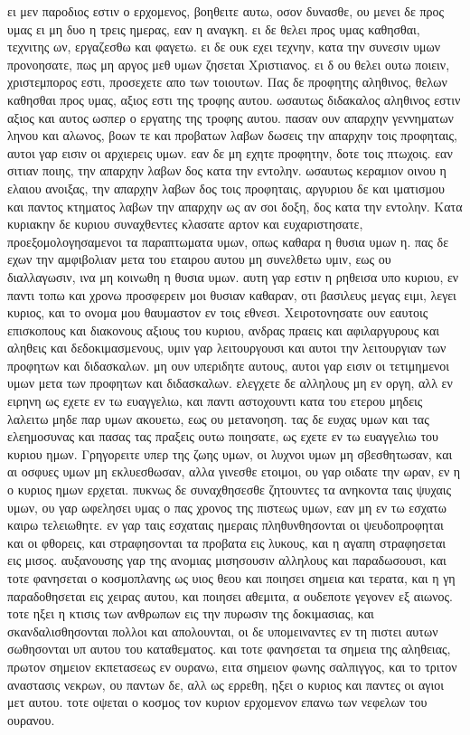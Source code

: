 ει μεν παροδιος εστιν ο ερχομενος, βοηθειτε αυτω, οσον δυνασθε, ου μενει δε προς υμας ει μη δυο η τρεις ημερας, εαν η αναγκη.
ει δε θελει προς υμας καθησθαι, τεχνιτης ων, εργαζεσθω και φαγετω.
ει δε ουκ εχει τεχνην, κατα την συνεσιν υμων προνοησατε, πως μη αργος μεθ υμων ζησεται Χριστιανος.
ει δ ου θελει ουτω ποιειν, χριστεμπορος εστι, προσεχετε απο των τοιουτων.
Πας δε προφητης αληθινος, θελων καθησθαι προς υμας, αξιος εστι της τροφης αυτου.
ωσαυτως διδακαλος αληθινος εστιν αξιος και αυτος ωσπερ ο εργατης της τροφης αυτου.
πασαν ουν απαρχην γεννηματων ληνου και αλωνος, βοων τε και προβατων λαβων δωσεις την απαρχην τοις προφηταις, αυτοι γαρ εισιν οι αρχιερεις υμων.
εαν δε μη εχητε προφητην, δοτε τοις πτωχοις.
εαν σιτιαν ποιης, την απαρχην λαβων δος κατα την εντολην.
ωσαυτως κεραμιον οινου η ελαιου ανοιξας, την απαρχην λαβων δος τοις προφηταις,
αργυριου δε και ιματισμου και παντος κτηματος λαβων την απαρχην ως αν σοι δοξη, δος κατα την εντολην.
Κατα κυριακην δε κυριου συναχθεντες κλασατε αρτον και ευχαριστησατε, προεξομολογησαμενοι τα παραπτωματα υμων, οπως καθαρα η θυσια υμων η.
πας δε εχων την αμφιβολιαν μετα του εταιρου αυτου μη συνελθετω υμιν, εως ου διαλλαγωσιν, ινα μη κοινωθη η θυσια υμων.
αυτη γαρ εστιν η ρηθεισα υπο κυριου, εν παντι τοπω και χρονω προσφερειν μοι θυσιαν καθαραν, οτι βασιλευς μεγας ειμι, λεγει κυριος, και το ονομα μου θαυμαστον εν τοις εθνεσι.
Χειροτονησατε ουν εαυτοις επισκοπους και διακονους αξιους του κυριου, ανδρας πραεις και αφιλαργυρους και αληθεις και δεδοκιμασμενους, υμιν γαρ λειτουργουσι και αυτοι την λειτουργιαν των προφητων και διδασκαλων.
μη ουν υπεριδητε αυτους, αυτοι γαρ εισιν οι τετιμημενοι υμων μετα των προφητων και διδασκαλων.
ελεγχετε δε αλληλους μη εν οργη, αλλ εν ειρηνη ως εχετε εν τω ευαγγελιω, και παντι αστοχουντι κατα του ετερου μηδεις λαλειτω μηδε παρ υμων ακουετω, εως ου μετανοηση.
τας δε ευχας υμων και τας ελεημοσυνας και πασας τας πραξεις ουτω ποιησατε, ως εχετε εν τω ευαγγελιω του κυριου ημων.
Γρηγορειτε υπερ της ζωης υμων, οι λυχνοι υμων μη σβεσθητωσαν, και αι οσφυες υμων μη εκλυεσθωσαν, αλλα γινεσθε ετοιμοι, ου γαρ οιδατε την ωραν, εν η ο κυριος ημων ερχεται.
πυκνως δε συναχθησεσθε ζητουντες τα ανηκοντα ταις ψυχαις υμων, ου γαρ ωφελησει υμας ο πας χρονος της πιστεως υμων, εαν μη εν τω εσχατω καιρω τελειωθητε.
εν γαρ ταις εσχαταις ημεραις πληθυνθησονται οι ψευδοπροφηται και οι φθορεις, και στραφησονται τα προβατα εις λυκους, και η αγαπη στραφησεται εις μισος.
αυξανουσης γαρ της ανομιας μισησουσιν αλληλους και παραδωσουσι, και τοτε φανησεται ο κοσμοπλανης ως υιος θεου και ποιησει σημεια και τερατα, και η γη παραδοθησεται εις χειρας αυτου, και ποιησει αθεμιτα, α ουδεποτε γεγονεν εξ αιωνος.
τοτε ηξει η κτισις των ανθρωπων εις την πυρωσιν της δοκιμασιας, και σκανδαλισθησονται πολλοι και απολουνται, οι δε υπομειναντες εν τη πιστει αυτων σωθησονται υπ αυτου του καταθεματος.
και τοτε φανησεται τα σημεια της αληθειας, πρωτον σημειον εκπετασεως εν ουρανω, ειτα σημειον φωνης σαλπιγγος, και το τριτον αναστασις νεκρων,
ου παντων δε, αλλ ως ερρεθη, ηξει ο κυριος και παντες οι αγιοι μετ αυτου.
τοτε οψεται ο κοσμος τον κυριον ερχομενον επανω των νεφελων του ουρανου.

